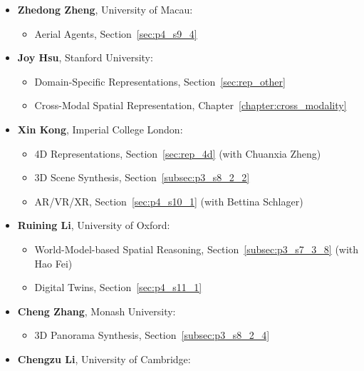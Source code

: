 \begin{itemize}[leftmargin=*]
        \begin{itemize}
            \item 2D Representations, Section~\ref{sec:rep_2d}
            \item Object Detection, Section~\ref{sec:6-1-2}
            \item Segmentation, Section~\ref{sec:segmentation}
        \end{itemize}
    \item \textbf{Zhedong Zheng}, University of Macau:
        \begin{itemize}
            \item Aerial Agents, Section~\ref{sec:p4_s9_4}
        \end{itemize}
    \item \textbf{Joy Hsu}, Stanford University:
        \begin{itemize}
            \item Domain-Specific Representations, Section~\ref{sec:rep_other}
            \item Cross-Modal Spatial Representation, Chapter~\ref{chapter:cross_modality}
        \end{itemize}
    \item \textbf{Xin Kong}, Imperial College London:
        \begin{itemize}
            \item 4D Representations, Section~\ref{sec:rep_4d} (with Chuanxia Zheng)
            \item 3D Scene Synthesis, Section~\ref{subsec:p3_s8_2_2}
            \item AR/VR/XR, Section~\ref{sec:p4_s10_1} (with Bettina Schlager)
        \end{itemize}
    \item \textbf{Ruining Li}, University of Oxford:
        \begin{itemize}
            \item World-Model-based Spatial Reasoning, Section~\ref{subsec:p3_s7_3_8} (with Hao Fei)
            \item Digital Twins, Section~\ref{sec:p4_s11_1}
        \end{itemize}
    \item \textbf{Cheng Zhang}, Monash University:
        \begin{itemize}
            \item 3D Panorama Synthesis, Section~\ref{subsec:p3_s8_2_4}
        \end{itemize}
    \item \textbf{Chengzu Li}, University of Cambridge:

\end{itemize}
